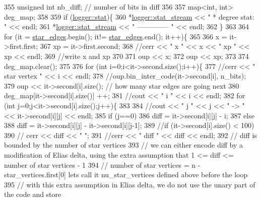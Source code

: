 \begin{DoxyCode}
355   \textcolor{keywordtype}{unsigned} \textcolor{keywordtype}{int} nb\_diff; \textcolor{comment}{// number of bits in diff}
356 
357   map<int, int> deg\_map;
358 
359   \textcolor{keywordflow}{if} (\hyperlink{classlogger_a26812b5ba03f130e8dae3446d5fc032f}{logger::stat})\{
360     *\hyperlink{classlogger_a7db37821f875f2ba3540980b355779f5}{logger::stat\_stream} << \textcolor{stringliteral}{" * degree stat: "} << endl;
361     *\hyperlink{classlogger_a7db37821f875f2ba3540980b355779f5}{logger::stat\_stream} << \textcolor{stringliteral}{" -------------- "} << endl;
362   \}
363 
364   \textcolor{keywordflow}{for} (it = \hyperlink{classmarked__graph__compressed_a7df5779d313486644132bd816937f532}{star\_edges}.begin(); it!= \hyperlink{classmarked__graph__compressed_a7df5779d313486644132bd816937f532}{star\_edges}.end(); it++)\{
365 
366     x = it->first.first;
367     xp = it->first.second;
368     \textcolor{comment}{//cerr << " x " << x << " xp " << xp << endl;}
369     \textcolor{comment}{//write x and xp}
370 
371     oup << x;
372     oup << xp;
373 
374     deg\_map.clear();
375 
376     \textcolor{keywordflow}{for} (\textcolor{keywordtype}{int} i=0;i<it->second.size();i++)\{
377       \textcolor{comment}{//cerr << " star vertex " << i << endl;}
378       \textcolor{comment}{//oup.bin\_inter\_code(it->second[i], n\_bits);}
379       oup << it->second[i].size(); \textcolor{comment}{// how many star edges are going next}
380       deg\_map[it->second[i].size()] ++;
381       \textcolor{comment}{//cout << " i " << i << endl;}
382       \textcolor{keywordflow}{for} (\textcolor{keywordtype}{int} j=0;j<it->second[i].size();j++)\{
383         
384         \textcolor{comment}{//cout << " j " << j << " -> " << it->second[i][j] << endl;}
385         \textcolor{keywordflow}{if} (j==0)
386           diff = it->second[i][j] - i;
387         \textcolor{keywordflow}{else}
388           diff = it->second[i][j] - it->second[i][j-1];
389         \textcolor{comment}{//if (it->second[i].size() < 100)}
390         \textcolor{comment}{//  cerr << diff << " ";}
391         \textcolor{comment}{//cerr << " diff " << diff << endl;}
392         \textcolor{comment}{// diff is bounded by the number of star vertices}
393         \textcolor{comment}{// we can either encode diff by a modification of Elias delta, using the extra assumption that 1 <=
       diff <= number of star vertices - 1}
394         \textcolor{comment}{// number of star vertices = n - star\_vertices.first[0] lets call it nu\_star\_vertices defined above
       before the loop}
395         \textcolor{comment}{// with this extra assumption in Elias delta, we do not use the unary part of the code and store
}
\end{DoxyCode}
